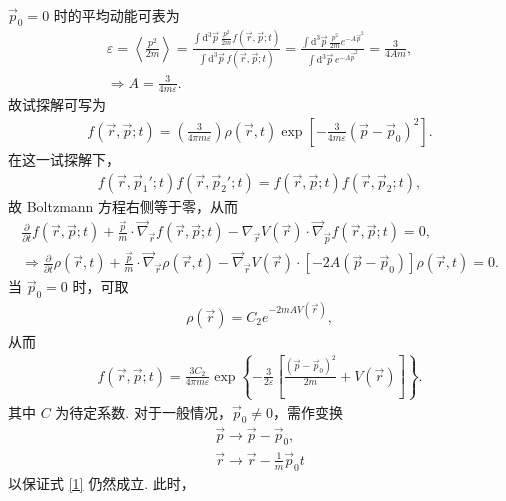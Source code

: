 \documentclass{assignment}
\begin{document}
\begin{sol}
\begin{align}
    \end{align}
    $\vec{p}_0=0$ 时的平均动能可表为
    \begin{gather}
        \varepsilon=\left\langle\frac{p^2}{2m}\right\rangle=\frac{\int\mathrm{d}^3\vec{p}\,\frac{p^2}{2m}f(\vec{r},\vec{p};t)}{\int\mathrm{d}^3\vec{p}\,f(\vec{r},\vec{p};t)}=\frac{\int\mathrm{d}^3\vec{p}\,\frac{p^2}{2m}e^{-A\vec{p}^2}}{\int\mathrm{d}^3\vec{p}\,e^{-A\vec{p}^2}}=\frac{3}{4Am},\\
        \Longrightarrow A=\frac{3}{4m\varepsilon}.
    \end{gather}
    故试探解可写为
    \begin{align}
        f(\vec{r},\vec{p};t)=\left(\frac{3}{4\pi m\varepsilon}\right)\rho(\vec{r},t)\exp\left[-\frac{3}{4m\varepsilon}(\vec{p}-\vec{p}_0)^2\right].
    \end{align}
    在这一试探解下，
    \begin{align}
        f(\vec{r},\vec{p}_1';t)f(\vec{r},\vec{p}_2';t)=f(\vec{r},\vec{p};t)f(\vec{r},\vec{p}_2;t),
    \end{align}
    故 Boltzmann 方程右侧等于零，从而
    \begin{gather}
        \frac{\partial}{\partial t}f(\vec{r},\vec{p};t)+\frac{\vec{p}}{m}\cdot\vec{\nabla}_{\vec{r}}f(\vec{r},\vec{p};t)-\nabla_{\vec{r}}V(\vec{r})\cdot\vec{\nabla}_{\vec{p}}f(\vec{r},\vec{p};t)=0,\\
        \label{1}\Longrightarrow\frac{\partial}{\partial t}\rho(\vec{r},t)+\frac{\vec{p}}{m}\cdot\vec{\nabla}_{\vec{r}}\rho(\vec{r},t)-\vec{\nabla}_{\vec{r}}V(\vec{r})\cdot\left[-2A(\vec{p}-\vec{p}_0)\right]\rho(\vec{r},t)=0.
    \end{gather}
    当 $\vec{p}_0=0$ 时，可取
    \begin{align}
        \rho(\vec{r})=C_2e^{-2mAV(\vec{r})},
    \end{align}
    从而
    \begin{align}
        f(\vec{r},\vec{p};t)=\frac{3C_2}{4\pi m\varepsilon}\exp\left\{-\frac{3}{2\varepsilon}\left[\frac{(\vec{p}-\vec{p}_0)^2}{2m}+V(\vec{r})\right]\right\}.
    \end{align}
    其中 $C$ 为待定系数.
    对于一般情况，$\vec{p}_0\neq 0$，需作变换
    \begin{align}
        \vec{p}\rightarrow\vec{p}-\vec{p}_0,\\
        \vec{r}\rightarrow\vec{r}-\frac{1}{m}\vec{p}_0t
    \end{align}
    以保证式 \eqref{1} 仍然成立.
    此时，
    \begin{align}

\end{align}
\end{sol}
\end{document}
